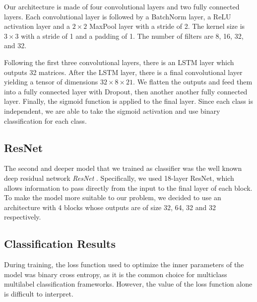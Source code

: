 \documentclass[runningheads,a4paper]{llncs}
\begin{document}
Our architecture is made of four convolutional layers and two fully connected layers. Each convolutional layer is followed by a BatchNorm layer, a ReLU activation layer and a $2 \times 2$  MaxPool layer with a stride of 2. The kernel size is $3 \times 3$ with a stride of 1 and a padding of 1. The number of filters are 8, 16, 32, and 32.

Following the first three convolutional layers, there is an LSTM layer which outputs 32 matrices. After the LSTM layer, there is a final convolutional layer yielding a tensor of dimensions $32\times 8 \times 21$. We flatten the outputs and feed them into a fully connected layer with Dropout, then another another fully connected layer. Finally, the sigmoid function is applied to the final layer. Since each class is independent, we are able to take the sigmoid activation and use binary classification for each class. %

\subsection{ResNet}

The second and deeper model that we trained as classifier was the well known deep residual network \emph{ResNet} \cite{He15}. Specifically, we used 18-layer ResNet, which allows information to pass directly from the input to the final layer of each block. To make the model more suitable to our problem, we decided to use an architecture with 4 blocks whose outputs are of size 32, 64, 32 and 32 respectively.

\subsection{Classification Results}

During training, the loss function used to optimize the inner parameters of the model was binary cross entropy, as it is the common choice for multiclass multilabel classification frameworks. However, the value of the loss function alone is difficult to interpret.
\end{document}

